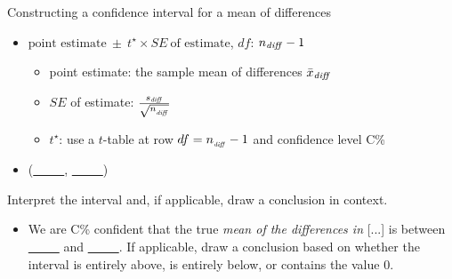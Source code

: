 \begin{onebox}{Constructing a confidence interval for a mean of differences}
\begin{itemize}
\item[] $\text{point estimate}\ \pm\ t^{\star} \times SE\ \text{of estimate}$, \quad $df$: $n_{\text{\emph{diff}}} - 1$
\begin{itemize}
\item[] point estimate: the sample mean of differences $\bar{x}_{\text{\emph{diff}}}$
\item[] $SE$ of estimate:  $\frac{s_{\text{\emph{diff}}}}{\sqrt{n_{_\text{\emph{diff}}}}}$
\item[] $t^{\star}$: use a $t$-table at row $df = n_{_\text{\emph{diff}}} - 1$ and confidence level C\%
\end{itemize}
\item[] (\underline{\ \ \ \ \ }, \underline{\ \ \ \ \ })
\end{itemize}
 Interpret the interval and, if applicable, draw a conclusion in context.\vspace{-1mm}
\begin{itemize}
\item[] We are C\%  confident that the true \emph{mean of the differences in} [...] is between \underline{\ \ \ \ \ } and  \underline{\ \ \ \ \ }. If applicable, draw a conclusion based on whether the interval is entirely above, is entirely below, or contains the value 0. 
\end{itemize}\end{onebox}


